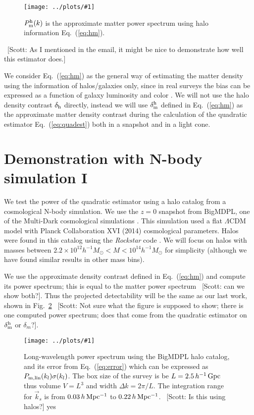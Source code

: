 \documentclass[prd,amsmath,amssymb,floatfix,superscriptaddress,nofootinbib,twocolumn]{revtex4-1}
\newcommand{\vk}{\vec{k}}
\newcommand{\ec}[1]{Eq.~(\ref{eq:#1})}
\newcommand{\rf}[1]{\ref{fig:#1}}
\newcommand{\sfig}[2]{
\texttt{[image: ../plots/\#1]}
        }
\newcommand{\Sfig}[2]{
   \begin{figure}[thbp]
   \begin{center}
    \sfig{../plots/#1.pdf}{\columnwidth}
    \caption{{\small #2}}
    \label{fig:#1}
     \end{center}
   \end{figure}
}
\newcommand{\scott}[1]{{\color{darkgreen} \, [Scott: #1]}}
\newcommand{\peikai}[1]{{\color{blue} #1}}
\newcommand\dmh{\delta_{\rm m}^{\rm h}}
\begin{document}
\Sfig{hm}{$P_{\rm m}^{\rm h}(k)$ is the approximate matter power spectrum using halo information \ec{hm}.}
\scott{As I mentioned in the email, it might be nice to demonstrate how well this estimator does.} 

We consider \ec{hm} as the general way of estimating the matter density using the information of halos/galaxies only, since in real surveys the bias can be expressed as a function of galaxy luminosity and color \cite{Cresswell:2008Col}. We will not use the halo density contrast $\delta_{\rm h}$ directly, instead we will use $\dmh$ defined in \ec{hm} as the approximate matter density contrast during the calculation of the quadratic estimator \ec{quadest} both in a snapshot and in a light cone.

\section{Demonstration with N-body simulation I} \label{sec3}
\noindent We test the power of the quadratic estimator using a halo catalog from a cosmological N-body simulation. We use the $z=0$ snapshot from BigMDPL, one of the Multi-Dark cosmological simulations \cite{Klypin:2014nov}. This simulation used a flat $\Lambda$CDM model with Planck Collaboration XVI (2014) \cite{Planck:2014cos} cosmological parameters. Halos were found in this catalog using the \textit{Rockstar} code \cite{Behroozi:2013Rock}. We will focus on halos with masses between $2.2 \times 10^{12}h^{-1}M_{\odot}<M < 10^{14}h^{-1}M_{\odot}$ for simplicity (although we have found similar results in other mass bins).

We use the approximate density contrast defined in \ec{hm} and compute its power spectrum; this is equal to the matter power spectrum \scott{can we show both?}. Thus the projected detectability will be the same as our last work, shown in Fig.~\rf{SN_BIGMDPL} \scott{Not sure what the figure is supposed to show; there is one computed power spectrum; does that come from the quadratic estimator on $\dmh$ or $\delta_m$?}.

\Sfig{SN_BIGMDPL}{Long-wavelength power spectrum using the BigMDPL halo catalog, and its error from \ec{error} which can be expressed as $P_{\rm m, lin}(k_l)\sigma(k_l)$. The box size of the survey is be $L=2.5\, h^{-1}\rm\, Gpc$ thus volume $V=L^3$ and width $\Delta k = 2\pi/L$. The integration range for $\vk_s$ is from $0.03 \,h \,\rm Mpc^{-1}$ to $0.22\,h\,\rm Mpc^{-1}$.\scott{Is this using halos?}\peikai{yes}}
\end{document}

